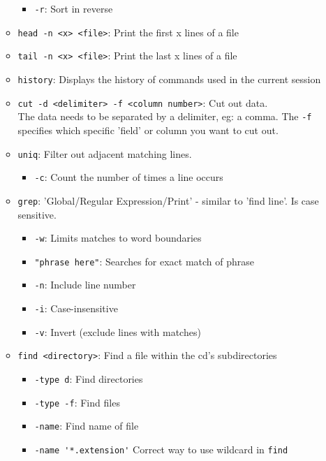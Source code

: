 \documentclass{article}
\begin{document}
\begin{itemize}
\begin{itemize}
\begin{itemize}
            \item \verb|-r|: Sort in reverse
        \end{itemize}
        \item \texttt{head -n <x> <file>}: Print the first x lines of a file
        \item \texttt{tail -n <x> <file>}: Print the last x lines of a file
        \item \verb|history|: Displays the history of commands used in the current session
        \item \texttt{cut -d <delimiter> -f <column number>}: Cut out data.\\ The data needs to be separated by a delimiter, eg: a comma. The \texttt {-f} specifies which specific 'field' or column you want to cut out.
        \item \texttt{uniq}: Filter out adjacent matching lines.
        \begin{itemize}
            \item \texttt{-c}: Count the number of times a line occurs
        \end{itemize}
        \item \verb|grep|: 'Global/Regular Expression/Print' - similar to 'find line'. Is case sensitive.
        \begin{itemize}
            \item \texttt{-w}: Limits matches to word boundaries
            \item \verb|"phrase here"|: Searches for exact match of phrase
            \item \texttt{-n}: Include line number
            \item \texttt{-i}: Case-insensitive
            \item \texttt{-v}: Invert (exclude lines with matches)
        \end{itemize}
        \item \texttt{find <directory>}: Find a file within the cd's subdirectories
            \begin{itemize}
                \item \verb|-type d|: Find directories
                \item \verb|-type -f|: Find files
                \item \verb|-name|: Find name of file
                \item \verb|-name '*.extension'| Correct way to use wildcard in \texttt{find}
            \end{itemize}

\end{itemize}
\end{itemize}
\end{document}
